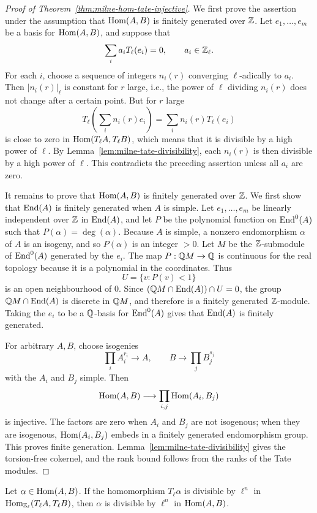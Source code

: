 \begin{proof}[Proof of Theorem~\ref{thm:milne-hom-tate-injective}]
We first prove the assertion under the assumption that $\operatorname{Hom}(A,B)$ is
finitely generated over $\mathbb{Z}$.  Let $e_1,\ldots,e_m$ be a basis for
$\operatorname{Hom}(A,B)$, and suppose that
\[
\sum_i a_iT_\ell(e_i)=0,\qquad a_i\in\mathbb{Z}_\ell.
\]
For each $i$, choose a sequence of integers $n_i(r)$ converging
$\ell$-adically to $a_i$.  Then $|n_i(r)|_\ell$ is constant for $r$ large,
i.e., the power of $\ell$ dividing $n_i(r)$ does not change after a certain
point.  But for $r$ large
\[
T_\ell\left(\sum_i n_i(r)e_i\right)=
\sum_i n_i(r)T_\ell(e_i)
\]
is close to zero in $\operatorname{Hom}(T_\ell A,T_\ell B)$, which means that it is
divisible by a high power of $\ell$.  By Lemma~\ref{lem:milne-tate-divisibility},
each $n_i(r)$ is then divisible by a high power of $\ell$.  This contradicts
the preceding assertion unless all $a_i$ are zero.

It remains to prove that $\operatorname{Hom}(A,B)$ is finitely generated over $\mathbb{Z}$.  We
first show that $\operatorname{End}(A)$ is finitely generated when $A$ is simple.  Let
$e_1,\ldots,e_m$ be linearly independent over $\mathbb{Z}$ in $\operatorname{End}(A)$, and let
$P$ be the polynomial function on $\operatorname{End}^0(A)$ such that $P(\alpha)=\deg(\alpha)$.
Because $A$ is simple, a nonzero endomorphism $\alpha$ of $A$ is an isogeny,
and so $P(\alpha)$ is an integer $>0$.  Let $M$ be the $\mathbb{Z}$-submodule of
$\operatorname{End}^0(A)$ generated by the $e_i$.  The map $P:\mathbb{Q} M\to\mathbb{Q}$ is continuous
for the real topology because it is a polynomial in the coordinates.  Thus
\[
U=\{v:P(v)<1\}
\]
is an open neighbourhood of $0$.  Since
$(\mathbb{Q} M\cap\operatorname{End}(A))\cap U=0$, the group $\mathbb{Q} M\cap\operatorname{End}(A)$ is discrete in
$\mathbb{Q} M$, and therefore is a finitely generated $\mathbb{Z}$-module.  Taking the $e_i$
to be a $\mathbb{Q}$-basis for $\operatorname{End}^0(A)$ gives that $\operatorname{End}(A)$ is finitely generated.

For arbitrary $A,B$, choose isogenies
\[
\prod_i A_i^{r_i}\longrightarrow A,\qquad
B\longrightarrow\prod_j B_j^{s_j}
\]
with the $A_i$ and $B_j$ simple.  Then
\[
\operatorname{Hom}(A,B)\longrightarrow\prod_{i,j}\operatorname{Hom}(A_i,B_j)
\]
is injective.  The factors are zero when $A_i$ and $B_j$ are not isogenous;
when they are isogenous, $\operatorname{Hom}(A_i,B_j)$ embeds in a finitely generated
endomorphism group.  This proves finite generation.  Lemma~\ref{lem:milne-tate-divisibility}
gives the torsion-free cokernel, and the rank bound follows from the ranks of
the Tate modules.
\end{proof}

\begin{lemma}
\label{lem:milne-tate-divisibility}

Let $\alpha\in\operatorname{Hom}(A,B)$.  If the homomorphism $T_\ell\alpha$ is divisible
by $\ell^n$ in $\operatorname{Hom}_{\mathbb{Z}_\ell}(T_\ell A,T_\ell B)$, then $\alpha$ is divisible by
$\ell^n$ in $\operatorname{Hom}(A,B)$.
\end{lemma}

